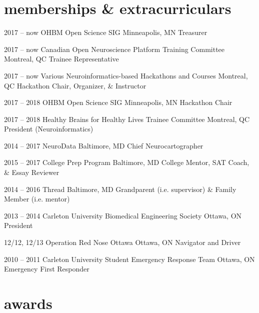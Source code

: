\documentclass[]{friggeri-cv} %
\begin{document}
\section{memberships \& extracurriculars}

\begin{entrylist}
\entry
{2017 -- now}
{OHBM Open Science SIG}
{Minneapolis, MN}
{Treasurer}

\entry
{2017 -- now}
{Canadian Open Neuroscience Platform Training Committee}
{Montreal, QC}
{Trainee Representative}

\entry
{2017 -- now}
{Various Neuroinformatics-based Hackathons and Courses}
{Montreal, QC}
{Hackathon Chair, Organizer, \& Instructor}

\entry
{2017 -- 2018}
{OHBM Open Science SIG}
{Minneapolis, MN}
{Hackathon Chair}

\entry
{2017 -- 2018}
{Healthy Brains for Healthy Lives Trainee Committee}
{Montreal, QC}
{President (Neuroinformatics)}

\entry
{2014 -- 2017}
{NeuroData}
{Baltimore, MD}
{Chief Neurocartographer}

\entry
{2015 -- 2017}
{College Prep Program}
{Baltimore, MD}
{College Mentor, SAT Coach, \& Essay Reviewer}

\entry
{2014 -- 2016}
{Thread}
{Baltimore, MD}
{Grandparent (i.e. supervisor) \& Family Member (i.e. mentor) }

\entry
{2013 -- 2014}
{Carleton University Biomedical Engineering Society}
{Ottawa, ON}
{President}

\entry
{12/12, 12/13}
{Operation Red Nose Ottawa}
{Ottawa, ON}
{Navigator and Driver}

\entry
{2010 -- 2011}
{Carleton University Student Emergency Response Team}
{Ottawa, ON}
{Emergency First Responder}
\end{entrylist}


\section{awards}
\end{document}
